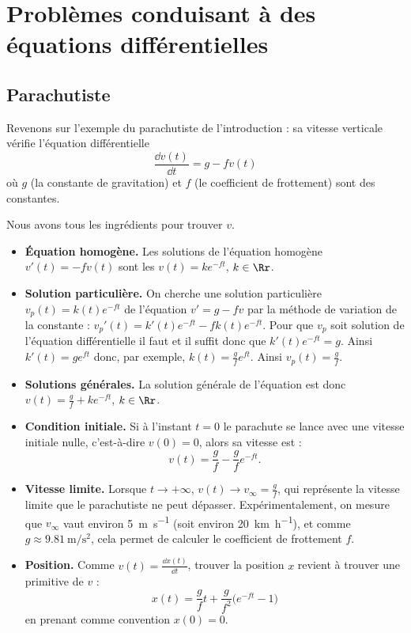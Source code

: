 \documentclass[class=report,crop=false]{standalone}
\begin{document}
\section{Problèmes conduisant à des équations différentielles}

\subsection{Parachutiste}


Revenons sur l'exemple du parachutiste de l'introduction :
sa vitesse verticale vérifie l'équation différentielle
$$\frac{\dd v(t)}{\dd t}= g - f v(t)$$
où $g$ (la constante de gravitation) et $f$ (le coefficient de frottement) sont des
constantes.


Nous avons tous les ingrédients pour trouver $v$.

\begin{itemize}
  \item \textbf{Équation homogène.}
  Les solutions de l'équation homogène $v'(t)=-fv(t)$ sont les $v(t)= ke^{-ft}$, $k\in\Rr$.

  \item \textbf{Solution particulière.}
  On cherche une solution particulière $v_p(t)=k(t)e^{-ft}$ de l'équation
  $v'= g - f v$ par la méthode de variation de la constante :
  $v_p'(t) = k'(t)  e^{-ft} -f k(t)e^{-ft}$. Pour que
  $v_p$ soit solution de l'équation différentielle il faut et il suffit donc que
  $k'(t)e^{-ft}=g$. Ainsi $k'(t)=ge^{ft}$ donc, par exemple, $k(t)=\frac{g}{f}e^{ft}$.
  Ainsi $v_p(t)=\frac{g}{f}$.

  \item \textbf{Solutions générales.}
  La solution générale de l'équation est donc $v(t)=\frac{g}{f}+k e^{-ft}$, $k\in\Rr$.

  \item \textbf{Condition initiale.}
  Si à l'instant $t=0$ le parachute se lance avec une vitesse initiale nulle, c'est-à-dire
  $v(0)=0$, alors sa vitesse est :
  $$v(t)=\frac{g}{f}-\frac{g}{f}e^{-ft}.$$


  \item \textbf{Vitesse limite.}
  Lorsque $t\to+\infty$, $v(t) \to v_\infty = \frac{g}{f}$, qui représente la vitesse limite
  que le parachutiste ne peut dépasser.
  Expérimentalement, on mesure que $v_\infty$ vaut environ \SI{5}{\meter\per\second}
  (soit environ \SI{20}{\kilo\meter\per\hour}), et comme $g \approx \SI{9.81}{\meter\per\second^2}$,
  cela permet de calculer le coefficient de frottement $f$.

  \item \textbf{Position.}
  Comme  $v(t) = \frac{\dd x(t)}{\dd t}$, trouver la position $x$ revient à trouver
  une primitive de $v$ :
  $$x(t) = \frac{g}{f} t + \frac{g}{f^2}\big(e^{-ft}-1\big)$$
  en prenant comme convention $x(0)=0$.
\end{itemize}
\end{document}

